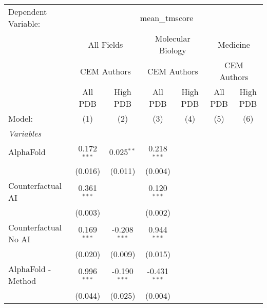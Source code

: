 \begingroup
\centering
\begin{tabular}{lcccccc}
   \tabularnewline \midrule \midrule
   Dependent Variable: & \multicolumn{6}{c}{mean\_tmscore}\\
 & \multicolumn{2}{c}{All Fields} & \multicolumn{2}{c}{Molecular Biology} & \multicolumn{2}{c}{Medicine} \\
\cmidrule(lr){2-3} \cmidrule(lr){4-5} \cmidrule(lr){6-7}
 & \multicolumn{2}{c}{CEM Authors} & \multicolumn{2}{c}{CEM Authors} & \multicolumn{2}{c}{CEM Authors} \\
\cmidrule(lr){2-3} \cmidrule(lr){4-5} \cmidrule(lr){6-7}
 & \multicolumn{1}{c}{All PDB} & \multicolumn{1}{c}{High PDB} & \multicolumn{1}{c}{All PDB} & \multicolumn{1}{c}{High PDB} & \multicolumn{1}{c}{All PDB} & \multicolumn{1}{c}{High PDB} \\
\cmidrule(lr){2-2} \cmidrule(lr){3-3} \cmidrule(lr){4-4} \cmidrule(lr){5-5} \cmidrule(lr){6-6} \cmidrule(lr){7-7}
   Model:                                                     & (1)            & (2)            & (3)            & (4) & (5) & (6)\\  
   \midrule
   \emph{Variables}\\
   AlphaFold                                                  & 0.172$^{***}$  & 0.025$^{**}$   & 0.218$^{***}$  &     &     &   \\   
                                                              & (0.016)        & (0.011)        & (0.004)        &     &     &   \\   
   Counterfactual AI                                          & 0.361$^{***}$  &                & 0.120$^{***}$  &     &     &   \\   
                                                              & (0.003)        &                & (0.002)        &     &     &   \\   
   Counterfactual No AI                                       & 0.169$^{***}$  & -0.208$^{***}$ & 0.944$^{***}$  &     &     &   \\   
                                                              & (0.020)        & (0.009)        & (0.015)        &     &     &   \\   
   AlphaFold - Method                                         & 0.996$^{***}$  & -0.190$^{***}$ & -0.431$^{***}$ &     &     &   \\   
                                                              & (0.044)        & (0.025)        & (0.004)        &     &     &   \\   

\end{tabular}
